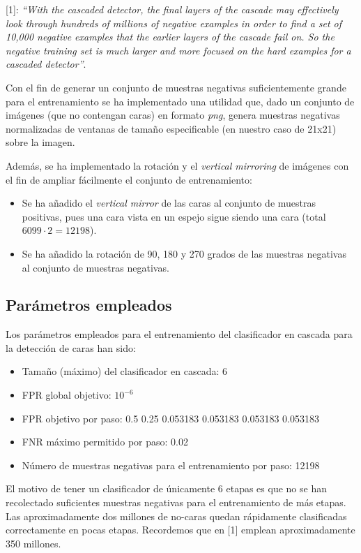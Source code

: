 \documentclass[11pt,spanish,a4paper]{article} %
\begin{document}
[1]: \textit{``With the cascaded detector, the final layers of the cascade may effectively look through hundreds of millions of negative examples in order to find a set of 10,000 negative examples that the earlier layers of the cascade fail on. So the negative training set is much larger and more focused on the hard examples for a cascaded detector''}.

Con el fin de generar un conjunto de muestras negativas suficientemente grande para el entrenamiento se ha implementado una utilidad que, dado un conjunto de imágenes (que no contengan caras) en formato \textit{png}, genera muestras negativas normalizadas de ventanas de tamaño especificable (en nuestro caso de 21x21) sobre la imagen.

Además, se ha implementado la rotación y el \textit{vertical mirroring} de imágenes con el fin de ampliar fácilmente el conjunto de entrenamiento:

\begin{itemize}
\item Se ha añadido el \textit{vertical mirror} de las caras al conjunto de muestras positivas, pues una cara vista en un espejo sigue siendo una cara (total $6099\cdot2 = 12198$).
\item Se ha añadido la rotación de 90, 180 y 270 grados de las muestras negativas al conjunto de muestras negativas.
\end{itemize}

\subsection{Parámetros empleados}

Los parámetros empleados para el entrenamiento del clasificador en cascada para la detección de caras han sido:

\begin{itemize}
\item Tamaño (máximo) del clasificador en cascada: 6
\item FPR global objetivo: $10^{-6}$
\item FPR objetivo por paso: 0.5 0.25 0.053183 0.053183 0.053183 0.053183
\item FNR máximo permitido por paso: 0.02
\item Número de muestras negativas para el entrenamiento por paso: 12198
\end{itemize}

El motivo de tener un clasificador de únicamente 6 etapas es que no se han recolectado suficientes muestras negativas para el entrenamiento de más etapas. Las aproximadamente dos millones de no-caras quedan rápidamente clasificadas correctamente en pocas etapas. Recordemos que en [1] emplean aproximadamente 350 millones.
\end{document}
